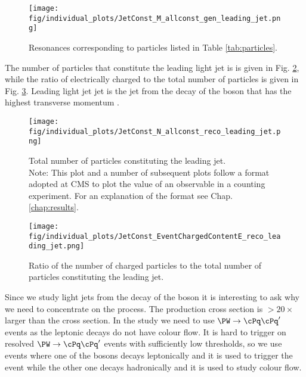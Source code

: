   \begin{figure}[hbtp]
    \centering
    \texttt{[image: fig/individual\_plots/JetConst\_M\_allconst\_gen\_leading\_jet.png]}
    \caption{Resonances corresponding to particles listed in Table \protect\ref{tab:particles}.}
    \label{fig:mass_resonances}
  \end{figure}

  The number of particles that constitute the leading light jet is is given in Fig. \ref{fig:number}, while the ratio of electrically charged to the total number of particles is given in Fig. \ref{fig:charged_content}. Leading light jet jet is the jet from the decay of the \PW boson that has the highest transverse momentum \pt.

  \begin{figure}[hbtp]
    \centering
    \texttt{[image: fig/individual\_plots/JetConst\_N\_allconst\_reco\_leading\_jet.png]}
    \caption{Total number of particles constituting the leading jet. \\
    \footnotesize Note: This plot and a number of subsequent plots follow a format adopted at CMS to plot the value of an observable in a counting experiment. For an explanation of the format see Chap. \protect\ref{chap:results}.}
    \label{fig:number}

\end{figure}
     \begin{figure}[hbtp]
     \centering
     \texttt{[image: fig/individual\_plots/JetConst\_EventChargedContentE\_reco\_leading\_jet.png]}
     \caption{Ratio of the number of charged particles to the total number of particles constituting the leading jet.}
  \label{fig:charged_content}
   \end{figure}

Since we study light jets from the decay of the \PW boson it is interesting to ask why we need to concentrate on the \ttbar process. The \PW production cross section is $>20\times$ larger than the \ttbar cross section. In the study we need to use  $\PW\rightarrow \cPq\cPq'$ events as the leptonic decays do not have colour flow. It is hard to trigger on resolved $\PW\rightarrow \cPq\cPq'$ events with sufficiently low \pt thresholds, so we use \ttbar events where one of the \PW bosons decays leptonically and it is used to trigger the event while the other one decays hadronically and it is used to study colour flow.

